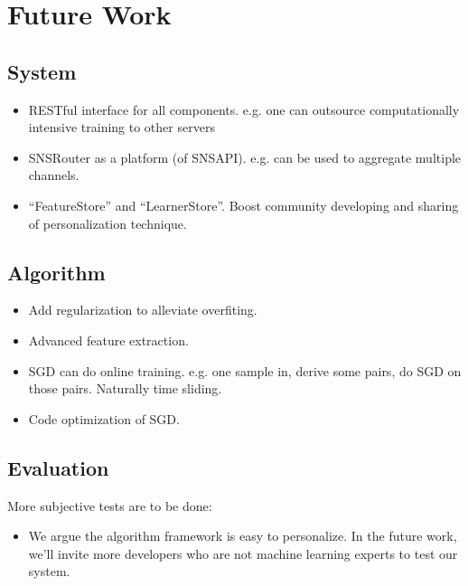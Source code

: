 \documentclass{sig-alternate}
\begin{document}
\section{Future Work}
\label{sec:Future Work}

\subsection{System}
\label{sec:fu_System}

\begin{itemize}
	\item RESTful interface for all components.
		e.g. one can outsource computationally
		intensive training to other servers
	\item SNSRouter as a platform (of SNSAPI).
		e.g. can be used to aggregate multiple
		channels. 
	\item ``FeatureStore'' and ``LearnerStore''. 
		Boost community developing and sharing of 
		personalization technique. 
\end{itemize}

\subsection{Algorithm}
\label{sec:fu_Algorithm}

\begin{itemize}
	\item Add regularization to alleviate overfiting. 
	\item Advanced feature extraction.
	\item SGD can do online training.
	e.g. one sample in, derive some pairs, do
	SGD on those pairs.
	Naturally time sliding.
	\item Code optimization of SGD. 
\end{itemize}

\subsection{Evaluation}
\label{sec:fu_Evaluation}

More subjective tests are to be done:

\begin{itemize}
	\item We argue the algorithm framework is easy to personalize. 
		In the future work, we'll invite more developers 
		who are not machine learning experts to test our system. 
\end{itemize}
\end{document}
